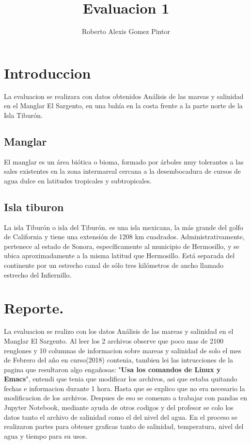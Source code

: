 \documentclass{article}
\title{Evaluacion 1}
\author{Roberto Alexis Gomez Pintor}
\begin{document}
\maketitle
\section{Introduccion}
La evaluacion se realizara con datos obtenidos Análisis de las mareas y salinidad en el Manglar El Sargento, en una bahía en la costa frente a la parte norte de la Isla
Tiburón.
\subsection{Manglar}
El manglar es un área biótica o bioma, formado por árboles muy tolerantes a las sales existentes en la zona intermareal cercana a la desembocadura de cursos de agua dulce en latitudes tropicales y subtropicales.
\subsection{Isla tiburon}
La isla Tiburón o isla del Tiburón. es una isla mexicana, la más grande del golfo de
California y tiene una extensión de 1208 km cuadrados. Administrativamente, pertenece al estado de Sonora, específicamente al municipio de Hermosillo, y se ubica aproximadamente a la misma latitud que Hermosillo. Está separada del continente por un estrecho canal de sólo tres kilómetros de ancho llamado estrecho del Infiernillo.
\section{Reporte.}
La evaluacion se realizo con los datos Análisis de las mareas y salinidad en el Manglar El Sargento. Al leer los 2 archivos observe que poco mas de 2100 renglones y 10 columnas de informacion sobre mareas y salinidad de solo el mes de Febrero del año en curso(2018) contenia, tambien lei las intrucciones de la pagina que resultaron algo engañosas: "\textbf{Usa los comandos de Linux y Emacs}", entendi que tenia que modificar los archivos, asi que estaba quitando fechas e informacion durante 1 hora. Hasta que se explico que no era necesario la modificacion de los archivos. Despues de eso se comenzo a trabajar con pandas en Jupyter Notebook, mediante ayuda de otros codigos y del profesor se colo los datos tanto el archivo de salinidad como el del nivel del agua. En el proceso se realizaron partes para obtener graficas tanto de salinidad, temperatura, nivel del agua y tiempo para su usos.
\end{document}
